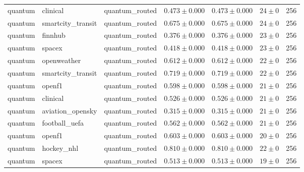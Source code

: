 \begin{table}[htbp]
\begin{tabular}{l l l r r r r}
quantum & clinical & quantum\_routed & $0.473\pm0.000$ & $0.473\pm0.000$ & $24\pm0$ & 256 \\
quantum & smartcity\_transit & quantum\_routed & $0.675\pm0.000$ & $0.675\pm0.000$ & $24\pm0$ & 256 \\
quantum & finnhub & quantum\_routed & $0.376\pm0.000$ & $0.376\pm0.000$ & $23\pm0$ & 256 \\
quantum & spacex & quantum\_routed & $0.418\pm0.000$ & $0.418\pm0.000$ & $23\pm0$ & 256 \\
quantum & openweather & quantum\_routed & $0.612\pm0.000$ & $0.612\pm0.000$ & $22\pm0$ & 256 \\
quantum & smartcity\_transit & quantum\_routed & $0.719\pm0.000$ & $0.719\pm0.000$ & $22\pm0$ & 256 \\
quantum & openf1 & quantum\_routed & $0.598\pm0.000$ & $0.598\pm0.000$ & $21\pm0$ & 256 \\
quantum & clinical & quantum\_routed & $0.526\pm0.000$ & $0.526\pm0.000$ & $21\pm0$ & 256 \\
quantum & aviation\_opensky & quantum\_routed & $0.315\pm0.000$ & $0.315\pm0.000$ & $21\pm0$ & 256 \\
quantum & football\_uefa & quantum\_routed & $0.562\pm0.000$ & $0.562\pm0.000$ & $21\pm0$ & 256 \\
quantum & openf1 & quantum\_routed & $0.603\pm0.000$ & $0.603\pm0.000$ & $20\pm0$ & 256 \\
quantum & hockey\_nhl & quantum\_routed & $0.810\pm0.000$ & $0.810\pm0.000$ & $22\pm0$ & 256 \\
quantum & spacex & quantum\_routed & $0.513\pm0.000$ & $0.513\pm0.000$ & $19\pm0$ & 256 \\
\hline
\end{tabular}
\end{table}
